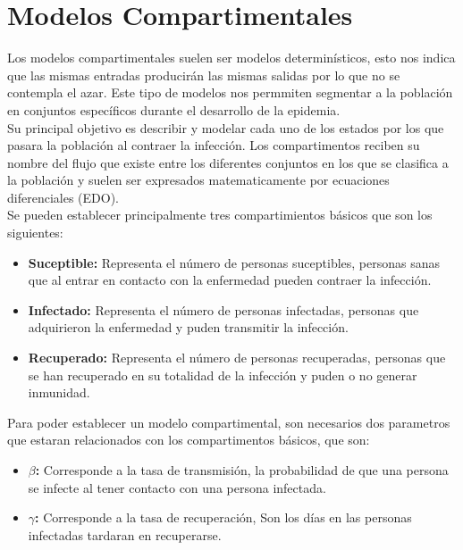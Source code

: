 \documentclass[a4paper,openany,12pt]{book}
\begin{document}
\chapter{Modelos Compartimentales}

Los modelos compartimentales suelen ser modelos determinísticos, esto nos indica que las mismas entradas producirán las mismas salidas por lo que no se contempla el azar. Este tipo de modelos nos permmiten segmentar a la población en conjuntos específicos durante el desarrollo de la epidemia.\\

Su principal objetivo es describir y modelar cada uno de los estados por los que pasara la población al contraer la infección.
Los compartimentos reciben su nombre del flujo que existe entre los diferentes conjuntos en los que se clasifica a la población y suelen ser expresados matematicamente por ecuaciones diferenciales (EDO).\\

Se pueden establecer principalmente tres compartimientos básicos que son los siguientes:

\begin{itemize}
\item \textbf{Suceptible:} Representa el número de personas suceptibles, personas sanas que al entrar en contacto con la enfermedad pueden contraer la infección.\\

\item \textbf{Infectado:} Representa el número de personas infectadas, personas que adquirieron la enfermedad y puden transmitir la infección.\\

\item \textbf{Recuperado:} Representa el número de personas recuperadas, personas que se han recuperado en su totalidad de la infección y puden o no generar inmunidad.
\end{itemize}

Para poder establecer un modelo compartimental, son necesarios dos parametros que estaran relacionados con los compartimentos básicos, que son: 

\begin{itemize}
\item \textbf{$\beta$:} Corresponde a la tasa de transmisión, la probabilidad de que una persona se infecte al tener contacto con una persona infectada.

\item \textbf{$\gamma$:} Corresponde a la tasa de recuperación, Son los días en las personas infectadas tardaran en recuperarse.

\end{itemize}
\end{document}
